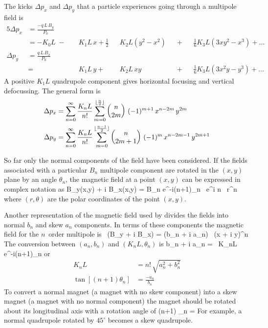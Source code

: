 The kicks $\Delta p_x$ and $\Delta p_y$ that a
particle experiences going through a multipole field is
\begin{alignat}{5}
  \Delta p_x & = \frac{-q \, L \, B_y}{P_0} \label{pqlbp1} \\
             & = -K_0 L \;-\; 
             && K_1 L \, x \plus 
             \frac{1}{2} && K_2 L (y^2 - x^2) && \plus 
             && \frac{1}{6} K_3 L (3x y^2 - x^3) \plus \ldots 
             \nonumber \\
  \Delta p_y & = \frac{q \, L \, B_x}{P_0} \label{pqlbp2} \\
             & =     
             && K_1 L \, y \plus 
             && K_2 L \, xy && \plus 
             && \frac{1}{6} K_3L (3x^2 y - y^3) \plus \ldots \nonumber 
\end{alignat}
A positive $K_1L$ quadrupole component gives
horizontal focusing and vertical defocussing. The general form is
\begin{align}
  \Delta p_x &= \sum_{n = 0}^{\infty} \frac{K_n L}{n!} 
             \sum_{m = 0}^{\lfloor \frac{n}{2} \rfloor}
             \begin{pmatrix} n \cr 2m \end{pmatrix} \,
             (-1)^{m+1} \, x^{n-2m} \, y^{2m} \\
  \Delta p_y &= \sum_{n = 0}^{\infty} \frac{K_n L}{n!} 
             \sum_{m = 0}^{\lfloor \frac{n-1}{2} \rfloor}
             \begin{pmatrix} n \cr 2m+1 \end{pmatrix} \,
             (-1)^{m} \, x^{n-2m-1} \, y^{2m+1}
\end{align}

So far only the normal components of the field have been
considered. If the fields associated with a particular $B_n$ multipole
component are rotated in the $(x, y)$ plane by an angle $\theta_n$, the
magnetic field at a point $(x,y)$ can be expressed in complex notation
as
\Begineq
  B_y(x,y) + i B_x(x,y) = 
     B_n e^{-i(n+1)\theta_n} \, e^{i n \theta} \, r^n 
  \label{bib1nb}
\Endeq
where $(r, \theta)$ are the polar coordinates of the point $(x, y)$.

Another representation of the magnetic field used by \bmad divides
the fields into normal $b_n$ and skew $a_n$ components. In terms of
these components the magnetic field for the $n$\Th\ order multipole is
\Begineq
   \, (B_y + i B_x) = (b_n + i a_n) \, (x + i y)^n
\Endeq
The conversion between $(a_n, b_n)$ and $(K_nL, \theta_n)$ is
\Begineq
  b_n + i a_n =  \, K_nL \, e^{-i(n+1)\theta_n}
\Endeq
or
\begin{align}
  K_n L &= n! \, \sqrt{a_n^2 + b_n^2} \\
  \tan[(n+1) \theta_n] &= \frac{-a_n}{b_n}
\end{align}
To convert a normal magnet (a magnet with no skew component) into a skew
magnet (a magnet with no normal component) the magnet should be rotated
about its longitudinal axis with a rotation angle of
\Begineq
  (n+1) \theta_n = 
\Endeq
For example, a normal quadrupole rotated by $45^\circ$ becomes a
skew quadrupole.

